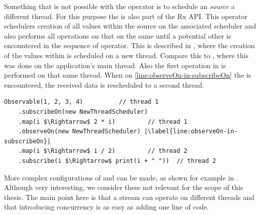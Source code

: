 Something that is not possible with the  operator is to schedule an \obs \textit{source} a different thread. For this purpose the  is also part of the Rx API. This operator schedulers creation of all values within the source on the associated scheduler and also performs all operations on that \obs on the same \sch until a potential other \sch is encountered in the sequence of operator. This is described in , where the creation of the values within  is scheduled on a new thread. Compare this to , where this was done on the application's main thread. Also the first  operation in  is performed on that same thread. When on \cref{line:observeOn-in-subscribeOn} the  is encountered, the received data is rescheduled to a second thread.

\begin{minipage}{\linewidth}
\begin{lstlisting}[style=ScalaStyle, caption={\code{subscribeOn} in a Rx sequence}, label={lst:subscribeOn}]
Observable(1, 2, 3, 4)			// thread 1
    .subscribeOn(new NewThreadScheduler)
    .map(i $\Rightarrow$ 2 * i)			// thread 1
    .observeOn(new NewThreadScheduler) |\label{line:observeOn-in-subscribeOn}|
    .map(i $\Rightarrow$ i / 2)			// thread 2
    .subscribe(i $\Rightarrow$ print(i + " "))	// thread 2
\end{lstlisting}
\end{minipage}

More complex configurations of  and  can be made, as shown for example in \cite{RxJava-Scheduling}. Although very interesting, we consider these not relevant for the scope of this thesis. The main point here is that a stream can operate on different threads and that introducing concurrency is as easy as adding one line of code.